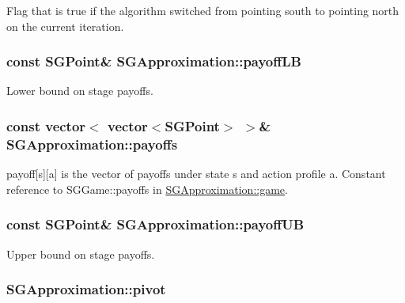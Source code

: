 Flag that is true if the algorithm switched from pointing south to pointing north on the current iteration. \hypertarget{classSGApproximation_a730a565edb81ab25cf99b8af3e8781ef}{
\subsubsection[{payoff\-L\-B}]{\setlength{\rightskip}{0pt plus 5cm}const {\bf S\-G\-Point}\& S\-G\-Approximation\-::payoff\-L\-B\hspace{0.3cm}{\ttfamily [private]}}}\label{classSGApproximation_a730a565edb81ab25cf99b8af3e8781ef}
Lower bound on stage payoffs. \hypertarget{classSGApproximation_aad5b271ff927a7f21080aab138cdd471}{
\subsubsection[{payoffs}]{\setlength{\rightskip}{0pt plus 5cm}const vector$<$ vector$<${\bf S\-G\-Point}$>$ $>$\& S\-G\-Approximation\-::payoffs\hspace{0.3cm}{\ttfamily [private]}}}\label{classSGApproximation_aad5b271ff927a7f21080aab138cdd471}
payoff\mbox{[}s\mbox{]}\mbox{[}a\mbox{]} is the vector of payoffs under state s and action profile a. Constant reference to S\-G\-Game\-::payoffs in \hyperlink{classSGApproximation_a3244a3d7de5f2b909d438f5b4ab337ee}{S\-G\-Approximation\-::game}. \hypertarget{classSGApproximation_a1b9d13241c1d3757f70099e3d6c279f5}{
\subsubsection[{payoff\-U\-B}]{\setlength{\rightskip}{0pt plus 5cm}const {\bf S\-G\-Point}\& S\-G\-Approximation\-::payoff\-U\-B\hspace{0.3cm}{\ttfamily [private]}}}\label{classSGApproximation_a1b9d13241c1d3757f70099e3d6c279f5}
Upper bound on stage payoffs. \hypertarget{classSGApproximation_ad7e37739a8b457ebe4a1c1e32bf9ca6c}{
\subsubsection[{pivot}]{ S\-G\-Approximation\-::pivot\hspace{0.3cm}{\ttfamily [private]}}}\label{classSGApproximation_ad7e37739a8b457ebe4a1c1e32bf9ca6c}
